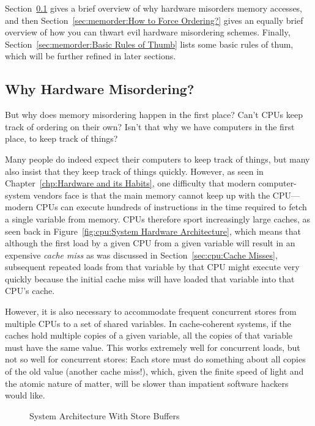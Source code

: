 Section~\ref{sec:memorder:Why Hardware Misordering?}
gives a brief overview of why hardware misorders memory accesses, and then
Section~\ref{sec:memorder:How to Force Ordering?}
gives an equally brief overview of how you can thwart evil hardware
misordering schemes.
Finally, Section~\ref{sec:memorder:Basic Rules of Thumb}
lists some basic rules of thum, which will be further refined in
later sections.

\subsection{Why Hardware Misordering?}
\label{sec:memorder:Why Hardware Misordering?}

But why does memory misordering happen in the first place?
Can't CPUs keep track of ordering on their own?
Isn't that why we have computers in the first place, to keep track of things?

Many people do indeed expect their computers to keep track of things,
but many also insist that they keep track of things quickly.
However, as seen in Chapter~\ref{chp:Hardware and its Habits},
one difficulty that modern computer-system vendors face is that
the main memory cannot keep up with the CPU---modern CPUs can execute
hundreds of instructions in the time required to fetch a single variable
from memory.
CPUs therefore sport increasingly large caches, as seen back in
Figure~\ref{fig:cpu:System Hardware Architecture}, which means that
although the first load by a given CPU from a given variable will
result in an expensive \emph{cache miss} as was discussed in
Section~\ref{sec:cpu:Cache Misses}, subsequent
repeated loads from that variable by that CPU might execute
very quickly because the initial cache miss will have loaded that
variable into that CPU's cache.

However, it is also necessary to accommodate frequent concurrent stores
from multiple CPUs to a set of shared variables.
In cache-coherent systems, if the caches hold multiple copies of a given
variable, all the copies of that variable must have the same value.
This works extremely well for concurrent loads, but not so well for
concurrent stores:  Each store must do something about all
copies of the old value (another cache miss!), which, given the finite
speed of light and the atomic nature of matter, will be slower
than impatient software hackers would like.

\begin{figure}[tb]
\centering
{}
\caption{System Architecture With Store Buffers}
\label{fig:memorder:System Architecture With Store Buffers}
\end{figure}

